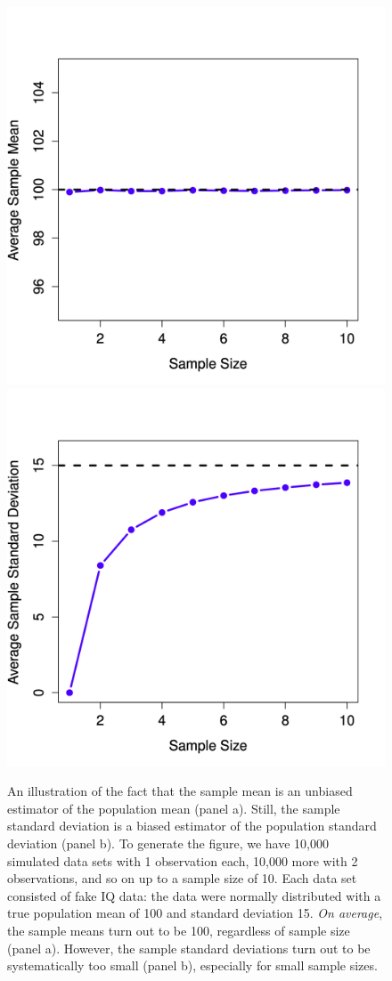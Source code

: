 \documentclass[
  11pt,
  a4paper,
  twoside,symmetric,openright]{book}
\theoremstyle{break}
\theoremstyle{break}
\begin{document}
\begin{figure}

{\centering \includegraphics[width=0.45\linewidth]{resources/image/biasMean} \includegraphics[width=0.45\linewidth]{resources/image/biasSD} 

}

\caption{An illustration of the fact that the sample mean is an unbiased estimator of the population mean (panel a). Still, the sample standard deviation is a biased estimator of the population standard deviation (panel b). To generate the figure, we have 10,000 simulated data sets with 1 observation each, 10,000 more with 2 observations, and so on up to a sample size of 10. Each data set consisted of fake IQ data: the data were normally distributed with a true population mean of 100 and standard deviation 15. \emph{On average}, the sample means turn out to be 100, regardless of sample size (panel a). However, the sample standard deviations turn out to be systematically too small (panel b), especially for small sample sizes.}\label{fig:estimatorbias}
\end{figure}
\end{document}
